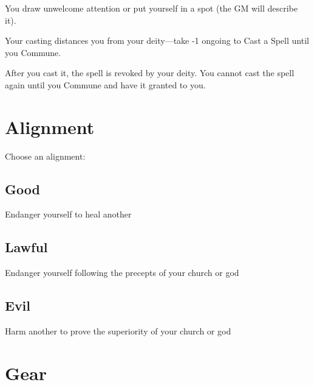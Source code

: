              
\startitemize[1,packed]
               
\item You draw unwelcome attention or put yourself in a spot (the GM will describe it).

               
\item Your casting distances you from your deity—take -1 ongoing to Cast a Spell until you Commune.

               
\item After you cast it, the spell is revoked by your deity. You cannot cast the spell again until you Commune and have it granted to you.

             
\stopitemize
           

         

       

       
\section{Alignment}   
       
\startInstructionsAfterHeader
Choose an alignment:
\stopInstructionsAfterHeader
       

         
\subsection{Good}   
         

Endanger yourself to heal another

         
\subsection{Lawful}   
         

Endanger yourself following the precepts of your church or god

         
\subsection{Evil}   
         

Harm another to prove the superiority of your church or god

       

       
\section{Gear}   
       

